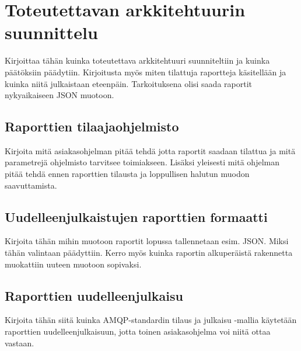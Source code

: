 \chapter{Toteutettavan arkkitehtuurin suunnittelu}
\label{ch:toteutettavan arkkitehtuurin suunnittelu}
Kirjoittaa tähän kuinka toteutettava arkkitehtuuri suunniteltiin ja kuinka päätöksiin päädytiin. Kirjoitusta myös miten tilattuja raportteja käsitellään ja kuinka niitä julkaistaan eteenpäin. Tarkoituksena olisi saada raportit nykyaikaiseen JSON muotoon.

\section{Raporttien tilaajaohjelmisto}
Kirjoita mitä asiakasohjelman pitää tehdä jotta raportit saadaan tilattua ja mitä parametrejä ohjelmisto tarvitsee toimiakseen. Lisäksi yleisesti mitä ohjelman pitää tehdä ennen raporttien tilausta ja loppullisen halutun muodon saavuttamista.

\section{Uudelleenjulkaistujen raporttien formaatti}
Kirjoita tähän mihin muotoon raportit lopussa tallennetaan esim. JSON. Miksi tähän valintaan päädyttiin. Kerro myös kuinka raportin alkuperäistä rakennetta muokattiin uuteen muotoon sopivaksi.

\section{Raporttien uudelleenjulkaisu}
Kirjoita tähän siitä kuinka AMQP-standardin tilaus ja julkaisu -mallia käytetään raporttien uudelleenjulkaisuun, jotta toinen asiakasohjelma voi niitä ottaa vastaan.